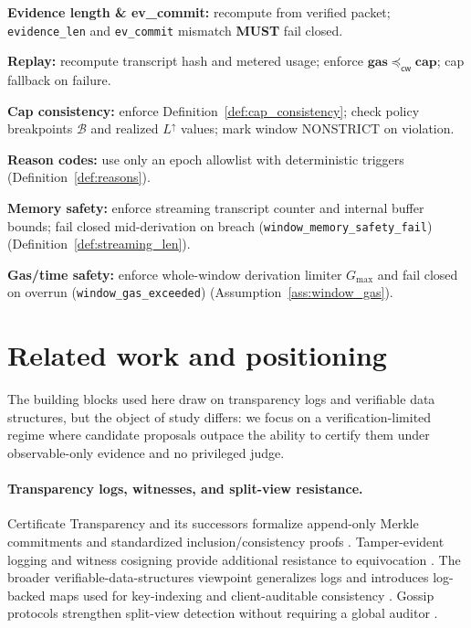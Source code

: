 \documentclass[11pt]{article}
\newcommand{\MUST}{\textbf{MUST}}
\newcommand{\code}[1]{\texttt{#1}}
\newcommand{\1}{\mathbf{1}}
\newcommand{\cwise}{\preceq_{\textsf{cw}}}
\theoremstyle{definition}
\theoremstyle{plain}
\begin{document}
\begin{tightitemize}
\item \textbf{Evidence length \& ev\_commit:} recompute from verified packet; \code{evidence\_len} and \code{ev\_commit} mismatch \MUST{} fail closed.
\item \textbf{Replay:} recompute transcript hash and metered usage; enforce $\mathbf{gas}\cwise\mathbf{cap}$; cap fallback on failure.
\item \textbf{Cap consistency:} enforce Definition~\ref{def:cap_consistency}; check policy breakpoints $\mathcal{B}$ and realized $L^\uparrow$ values; mark window NONSTRICT on violation.
\item \textbf{Reason codes:} use only an epoch allowlist with deterministic triggers (Definition~\ref{def:reasons}).
\item \textbf{Memory safety:} enforce streaming transcript counter and internal buffer bounds; fail closed mid-derivation on breach (\code{window\_memory\_safety\_fail}) (Definition~\ref{def:streaming_len}).
\item \textbf{Gas/time safety:} enforce whole-window derivation limiter $G_{\max}$ and fail closed on overrun (\code{window\_gas\_exceeded}) (Assumption~\ref{ass:window_gas}).
\end{tightitemize}

\section{Related work and positioning}
\label{sec:related}

The building blocks used here draw on transparency logs and verifiable data structures, but the object of study differs: we focus on a verification-limited regime where candidate proposals outpace the ability to certify them under observable-only evidence and no privileged judge.

\paragraph{Transparency logs, witnesses, and split-view resistance.}
Certificate Transparency and its successors formalize append-only Merkle commitments and standardized inclusion/consistency proofs \cite{Merkle1987,RFC6962,RFC9162}. Tamper-evident logging and witness cosigning provide additional resistance to equivocation \cite{CrosbyWallach2009,SytaCoSi2016}. The broader verifiable-data-structures viewpoint generalizes logs and introduces log-backed maps used for key-indexing and client-auditable consistency \cite{EijdenbergVDS2015,CoxTlog2019}. Gossip protocols strengthen split-view detection without requiring a global auditor \cite{ChuatGossip2015,MeiklejohnGossipAudits2020}.
\end{document}
